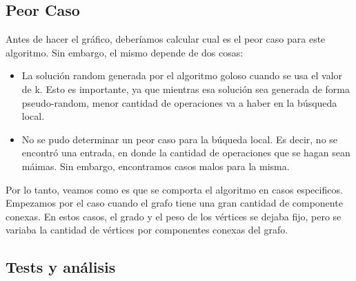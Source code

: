 \subsection{Peor Caso}
Antes de hacer el gráfico, deberíamos calcular cual es el peor caso para este algoritmo. Sin embargo, el mismo depende de dos cosas:
\begin{itemize}
\item La solución random generada por el algoritmo goloso cuando se usa el valor de k. 	Esto es importante, ya que mientras esa solución sea generada de forma pseudo-random, menor cantidad
	de operaciones va a haber en la búsqueda local.
\item No se pudo determinar un peor caso para la búqueda local. Es decir, no se encontró una entrada, en donde la
	cantidad de operaciones que se hagan sean máimas. Sin embargo, encontramos casos malos para la misma.
\end{itemize}
Por lo tanto, veamos como es que se comporta el algoritmo en casos especificos. Empezamos por el caso cuando el
grafo tiene una gran cantidad de componente conexas. En estos casos, el grado y el peso de los vértices se dejaba fijo,
pero se variaba la cantidad de vértices por componentes conexas del grafo.

\subsection{Tests y análisis}



